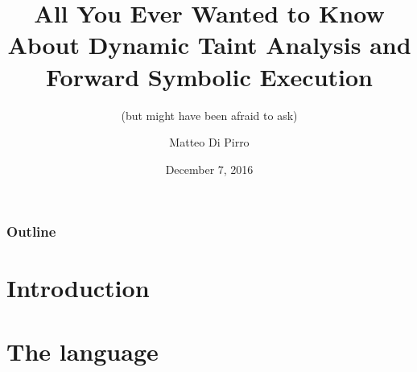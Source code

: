 \documentclass{beamer}
\title{All You Ever Wanted to Know About Dynamic Taint Analysis and Forward Symbolic Execution}
\subtitle{(but might have been afraid to ask)}
\author{Matteo Di Pirro}
\date{December 7, 2016}
\institute{University of Padova}
\begin{document}
\begin{frame}
\titlepage
\end{frame}

\begin{frame}
	\frametitle{Outline}
	\tableofcontents
\end{frame}

\section{Introduction}




\section{The language}


\appendix
\makethanks
\end{document}
